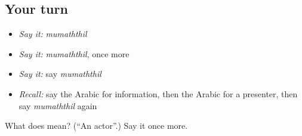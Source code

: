 \subsection*{Your turn}
\begin{itemize}
\raggedright
  \item \emph{Say it:} \emph{mumaththil}
  \item \emph{Say it:} \emph{mumaththil}, once more
  \item \emph{Say it:} say \emph{mumaththil}
  \item \emph{Recall:} say the Arabic for information, then the Arabic for a presenter, then say \emph{mumaththil} again
\end{itemize}

\begin{tcolorbox}[breakable,colback=teal!4,colframe=teal!35!black,title={Before you move on}]
What does  mean? (\textquotedblleft{}An actor\textquotedblright{}.) Say it once more.
\end{tcolorbox}

